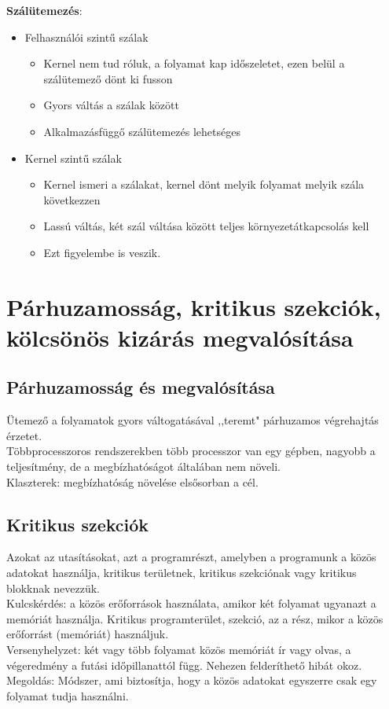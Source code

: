 \documentclass[margin=0px]{article}
\begin{document}
\textbf{Szálütemezés}:
\begin{itemize}
    \item Felhasználói szintű szálak
          \begin{itemize}
              \item Kernel nem tud róluk, a folyamat kap időszeletet, ezen belül a szálütemező dönt ki fusson
              \item Gyors váltás a szálak között
              \item Alkalmazásfüggő szálütemezés lehetséges
          \end{itemize}
    \item Kernel szintű szálak
          \begin{itemize}
              \item Kernel ismeri a szálakat, kernel dönt melyik folyamat melyik szála következzen
              \item Lassú váltás, két szál váltása között teljes környezetátkapcsolás kell
              \item Ezt figyelembe is veszik.
          \end{itemize}
\end{itemize}

\section{Párhuzamosság, kritikus szekciók, kölcsönös kizárás megvalósítása}

\subsection{Párhuzamosság és megvalósítása}

Ütemező a folyamatok gyors váltogatásával ,,teremt" párhuzamos végrehajtás érzetet. \\
Többprocesszoros rendszerekben több processzor van egy gépben, nagyobb a teljesítmény, de a megbízhatóságot általában nem növeli. \\
Klaszterek: megbízhatóság növelése elsősorban a cél.

\subsection{Kritikus szekciók}

Azokat az utasításokat, azt a programrészt, amelyben a programunk a közös adatokat használja, kritikus területnek, kritikus szekciónak vagy kritikus blokknak nevezzük. \\
Kulcskérdés: a közös erőforrások használata, amikor két folyamat ugyanazt a memóriát használja. Kritikus programterület, szekció, az a rész, mikor a közös erőforrást (memóriát) használjuk. \\
Versenyhelyzet: két vagy több folyamat közös memóriát ír vagy olvas, a végeredmény a futási időpillanattól függ. Nehezen felderíthető hibát okoz. \\
Megoldás: Módszer, ami biztosítja, hogy a közös adatokat egyszerre csak egy folyamat tudja használni.
\end{document}
